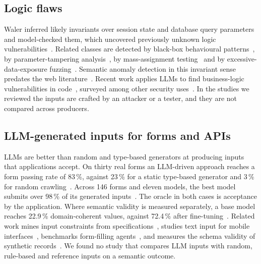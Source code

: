 \documentclass[conference]{IEEEtran}
\begin{document}
\subsection{Logic flaws}
Waler inferred likely invariants over session state and database query parameters and model-checked
them, which uncovered previously unknown logic vulnerabilities~\cite{felmetsger2010waler}. Related
classes are detected by black-box behavioural patterns~\cite{pellegrino2014logicflaws}, by
parameter-tampering analysis~\cite{bisht2010notamper}, by mass-assignment
testing~\cite{corradini2023massassignment} and by excessive-data-exposure
fuzzing~\cite{pan2024edefuzz}. Semantic anomaly detection in this invariant sense predates the web
literature~\cite{raz2002semanticanomaly}. Recent work applies LLMs to find business-logic
vulnerabilities in code~\cite{metin2025blv,armillotta2026antaeus}, surveyed among other security
uses~\cite{sheng2025llmsecsurvey}. In the studies we reviewed the inputs are crafted by an attacker or
a tester, and they are not compared across producers.

\subsection{LLM-generated inputs for forms and APIs}
LLMs are better than random and type-based generators at producing inputs that applications accept. On
thirty real forms an LLM-driven approach reaches a form passing rate of 83\,\%, against 23\,\% for a
static type-based generator and 3\,\% for random crawling~\cite{alian2024formnexus}. Across 146 forms
and eleven models, the best model submits over 98\,\% of its generated inputs~\cite{li2026webformtest}.
The oracle in both cases is acceptance by the application. Where semantic validity is measured
separately, a base model reaches 22.9\,\% domain-coherent values, against 72.4\,\% after
fine-tuning~\cite{kim2025llamaresttest}. Related work mines input constraints from
specifications~\cite{kim2024restgpt,huynh2024constraints}, studies text input for mobile
interfaces~\cite{cui2024guitextinput}, benchmarks form-filling agents~\cite{li2025formfactory}, and
measures the schema validity of synthetic records~\cite{mishra2026structuredsynthetic}. We found no
study that compares LLM inputs with random, rule-based and reference inputs on a semantic outcome.
\end{document}
